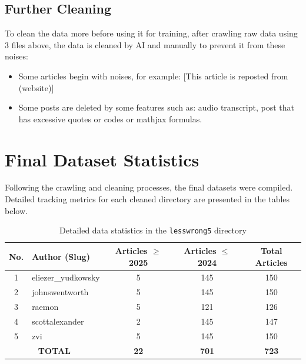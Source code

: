 \documentclass[12pt, a4paper]{article}
\begin{document}
\subsection{Further Cleaning}
To clean the data more before using it for training, after crawling raw data using 3 files above, the data is cleaned by AI and manually to prevent it from these noises:
\begin{itemize}
    \item Some articles begin with noises, for example: [This article is reposted from (website)]
    \item Some posts are deleted by some features such as: audio transcript, post that has excessive quotes or codes or mathjax formulas.
\end{itemize}

\section{Final Dataset Statistics}
Following the crawling and cleaning processes, the final datasets were compiled. Detailed tracking metrics for each cleaned directory are presented in the tables below.

\begin{table}[H]
\centering
\caption{Detailed data statistics in the \texttt{lesswrong5} directory}
\label{tab:dataset_lesswrong5}
\begin{tabular}{|c|l|c|c|c|}
\hline
\textbf{No.} & \textbf{Author (Slug)} & \textbf{Articles $\ge$ 2025} & \textbf{Articles $\le$ 2024} & \textbf{Total Articles} \\ \hline
1 & eliezer\_yudkowsky & 5 & 145 & 150 \\ \hline
2 & johnswentworth & 5 & 145 & 150 \\ \hline
3 & raemon & 5 & 121 & 126 \\ \hline
4 & scottalexander & 2 & 145 & 147 \\ \hline
5 & zvi & 5 & 145 & 150 \\ \hline
\multicolumn{2}{|c|}{\textbf{TOTAL}} & \textbf{22} & \textbf{701} & \textbf{723} \\ \hline
\end{tabular}
\end{table}
\end{document}

